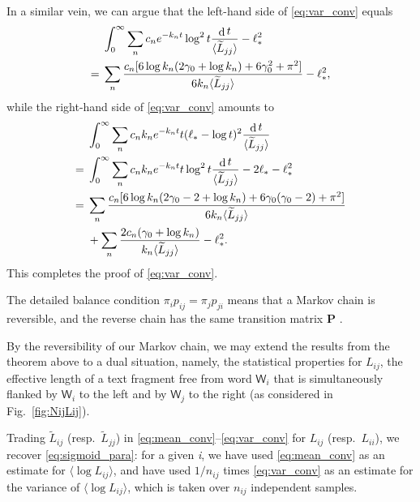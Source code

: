 \documentclass[10pt,journal,compsoc]{IEEEtran}
\DeclareMathOperator{\D}{d}
\begin{document}
\begin{IEEEproof}
In a similar vein, we can argue that the left-hand side of  \eqref{eq:var_conv} equals\begin{align}&
\int_0^\infty\displaystyle\sum_nc_ne^{-k_nt}\log^{2} t\frac{\D t}{\langle\widetilde L_{jj}\rangle}-\ell_*^2\notag\\={}&\displaystyle\sum_n\frac{c_n[6 \log k_{n} (2 \gamma_{0} +\log k_{n})+6 \gamma ^2_{0}+\pi ^2]}{6k_{n}\langle\widetilde L_{jj}\rangle}-\ell_*^{2},\end{align}
while  the right-hand side of  \eqref{eq:var_conv} amounts to {\allowdisplaybreaks\begin{align}&\int_0^\infty\displaystyle\sum_nc_nk_{n}e^{-k_nt}t(\ell_*-\log t)^{2}\frac{\D t}{\langle\widetilde L_{jj}\rangle}\notag\\={}&\int_0^\infty\displaystyle\sum_nc_nk_{n}e^{-k_nt}t\log^{2} t\frac{\D t}{\langle\widetilde L_{jj}\rangle}-2\ell_*-\ell_*^2\notag\\={}&\displaystyle\sum_n\frac{c_n[6 \log k_{n}  (2 \gamma _{0}-2+\log k_{n} )+6 \gamma_{0}  (\gamma_{0} -2)+\pi ^2]}{6k_{n}\langle\widetilde L_{jj}\rangle}\notag\\{}&+\displaystyle\sum_n\frac{2c_n(\gamma_0+\log k_n)}{k_{n}\langle\widetilde L_{jj}\rangle}-\ell_*^2.\end{align}}This completes the proof of  \eqref{eq:var_conv}.      \end{IEEEproof}

The detailed balance condition $ \pi_ip_{ij}=\pi_jp_{ji}$ means that a Markov chain  is reversible, and the reverse chain has the same transition matrix $ \mathbf P$   \cite[\S4.7, p.~203]{Ross1995}.

By the reversibility of our Markov chain, we may extend the results from the theorem above to a dual situation, namely, the statistical properties for  $ L_{ij} $, the effective length of a text fragment free from word $\mathsf W_i$ that is simultaneously flanked by $\mathsf W_i$ to the left and by $\mathsf W_j$ to the right (as considered in Fig.~\ref{fig:NijLij}).

 Trading $ \widetilde L_{ij}$ (resp.~$\widetilde L_{jj}$) in   \eqref{eq:mean_conv}--\eqref{eq:var_conv} for  $  L_{ij}$ (resp.~$ L_{ii}$), we recover \eqref{eq:sigmoid_para}: for a given \textit{i}, we have used  \eqref{eq:mean_conv} as an estimate for  $ \langle \log L_{ij}\rangle$, and have used $ 1/n_{ij}$ times   \eqref{eq:var_conv} as an estimate for the variance of $ \langle \log L_{ij}\rangle $, which is taken over $n_{ij}$ independent samples.
\ifCLASSOPTIONcompsoc
\end{document}
